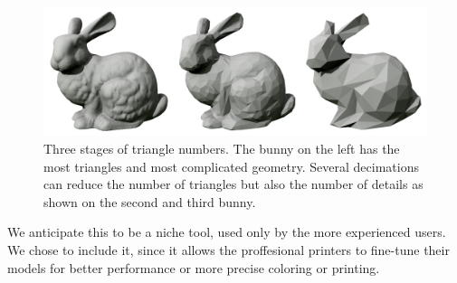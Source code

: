 \begin{figure}
	\centering
	\includegraphics[scale=0.25]{images/decimated_bunny.png}
	\caption{Three stages of triangle numbers. The bunny on the left has the most triangles and most complicated geometry. Several decimations can reduce the number of triangles but also the number of details as shown on the second and third bunny.}
	\label{fig:decimated}
\end{figure}

We anticipate this to be a niche tool, used only by the more experienced users. We chose to include it, since it allows the proffesional printers to fine-tune their models for better performance or more precise coloring or printing.